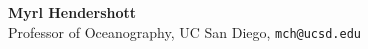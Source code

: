 \documentclass[a4paper,11pt,final]{memoir}
\newcommand{\Sep}{\vspace{1.25em}}
\newcommand{\SmallSep}{\vspace{0.5em}}
\newcommand{\CVSection}[1]
    {\Large\textbf{#1}\par
    \SmallSep\normalsize\normalfont}
\newcommand{\CVItem}[1]
    {\textbf{\color{NavyBlue} #1}}
\begin{document}
\SmallSep

\CVItem{Myrl Hendershott}\\
Professor of Oceanography, UC San Diego, \texttt{mch@ucsd.edu}











%
%
%
%
%
\end{document}
